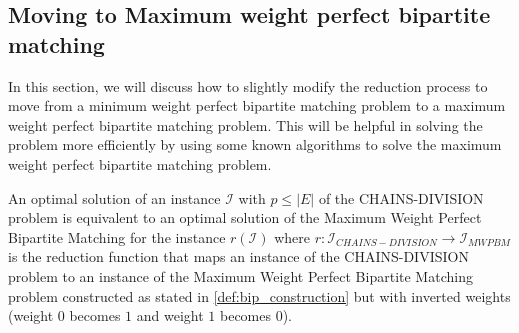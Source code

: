 \begin{comment}
            \draw[black, dashed, ->] (1s) -- (1d);
            \draw[black, dashed, ->] (2s) -- (2d);
            \draw[black, ->] (3s) -- (3d);
            \draw[black, dashed, ->] (4s) -- (3d);
            \draw[black, dashed, ->] (4s) -- (4d);
            \draw[black, ->] (4s) -- (6d);
            \draw[black, dashed, ->] (5s) -- (4d);
            \draw[black, ->] (5s) -- (5d);
            \draw[black, dashed, ->] (6s) -- (5d);
            \draw[black, dashed, ->] (6s) -- (6d);
            \draw[black, ->] (6s) -- (8d);
            \draw[black, ->] (6s) -- (9d);
            \draw[black, dashed, ->] (7s) -- (6d);
            \draw[black, ->] (7s) -- (8d);
            \draw[black, ->] (7s) -- (9d);
            \draw[black, ->] (8s) -- (7d);
            \draw[black, ->] (9s) -- (8d);
            \draw[black, ->] (9s) -- (9d);
        \end{tikzpicture} \\
    (a) & (b) \\
    \end{tabular}
    \caption[Reduction heuristics example]{Example of a reduction for the sorted nodes' equivalency classes $E = \{1,2,1,3,1,2,2\}$ applying also the heuristics shown. In (a), the edges removed are shown in green for \cref{lemma:sources_optimization}, blue for \cref{lemma:tree_optimization_1}, and red for \cref{lemma:tree_optimization_2}. In (b), we have the resulting bipartite graph after the heuristics are applied. Dashed edges weigh $1$, while solid edges weigh $0$. \alessio{Invertirei la notazione degli archi: dashed (semi-trasparente) logicamente ha peso 0, mentre solid (si vede bene) ha peso 1.}}
    \label{fig:heuristics_example}
\end{figure}
\end{comment}

\subsection{Moving to Maximum weight perfect bipartite matching}
In this section, we will discuss how to slightly modify the reduction process to move from a minimum weight perfect bipartite matching problem to a maximum weight perfect bipartite matching problem. This will be helpful in solving the problem more efficiently by using some known algorithms to solve the maximum weight perfect bipartite matching problem.

\begin{theorem}
    An optimal solution of an instance $\mathcal I$ with $p \leq |E|$ of the \textsc{CHAINS-DIVISION} problem is equivalent to an optimal solution of the Maximum Weight Perfect Bipartite Matching for the instance $r(\mathcal I)$ where $r: \mathcal{I}_{CHAINS-DIVISION} \rightarrow \mathcal{I}_{MWPBM}$ is the reduction function that maps an instance of the \textsc{CHAINS-DIVISION} problem to an instance of the Maximum Weight Perfect Bipartite Matching problem constructed as stated in \cref{def:bip_construction} but with inverted weights (weight $0$ becomes $1$ and weight $1$ becomes $0$).
\end{theorem}


